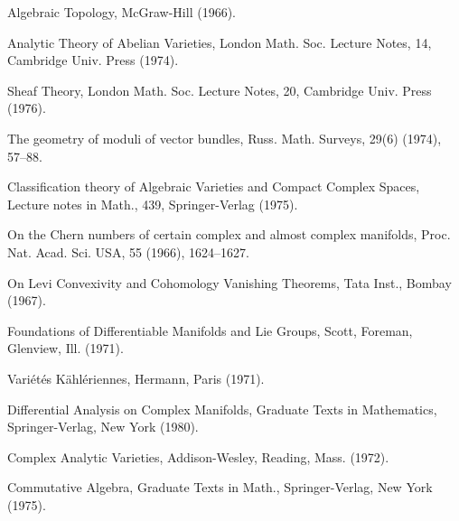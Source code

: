 \begin{sourcebibliography}
 Algebraic Topology, McGraw-Hill (1966).
\end{sourcebibliography}
\begin{sourcebibliography}
 Analytic Theory of Abelian Varieties, London Math. Soc. Lecture Notes, 14, Cambridge Univ. Press (1974).
\end{sourcebibliography}
\begin{sourcebibliography}
 Sheaf Theory, London Math. Soc. Lecture Notes, 20, Cambridge Univ. Press (1976).
\end{sourcebibliography}
\begin{sourcebibliography}
 The geometry of moduli of vector bundles, Russ. Math. Surveys, 29(6) (1974), 57--88.
\end{sourcebibliography}
\begin{sourcebibliography}
 Classification theory of Algebraic Varieties and Compact Complex Spaces, Lecture notes in Math., 439, Springer-Verlag (1975).
\end{sourcebibliography}
\begin{sourcebibliography}
 On the Chern numbers of certain complex and almost complex manifolds, Proc. Nat. Acad. Sci. USA, 55 (1966), 1624--1627.
\end{sourcebibliography}
\begin{sourcebibliography}
 On Levi Convexivity and Cohomology Vanishing Theorems, Tata Inst., Bombay (1967).
\end{sourcebibliography}
\begin{sourcebibliography}
 Foundations of Differentiable Manifolds and Lie Groups, Scott, Foreman, Glenview, Ill. (1971).
\end{sourcebibliography}
\begin{sourcebibliography}
 Vari\'et\'es K\"ahl\'eriennes, Hermann, Paris (1971).
\end{sourcebibliography}
\begin{sourcebibliography}
 Differential Analysis on Complex Manifolds, Graduate Texts in Mathematics, Springer-Verlag, New York (1980).
\end{sourcebibliography}
\begin{sourcebibliography}
 Complex Analytic Varieties, Addison-Wesley, Reading, Mass. (1972).
\end{sourcebibliography}
\begin{sourcebibliography}
 Commutative Algebra, Graduate Texts in Math., Springer-Verlag, New York (1975).
\end{sourcebibliography}
